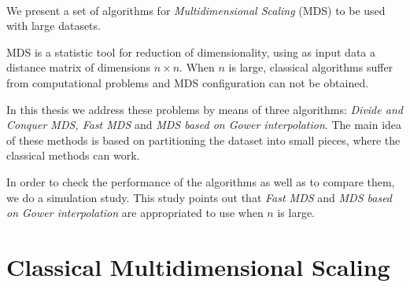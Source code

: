\documentclass[11pt]{report}
\begin{document}










\thispagestyle{empty}





\clearpage



 \\
\indent We present a set of algorithms for \textit{Multidimensional Scaling} (MDS) to 
be used with large datasets.

\indent MDS is a statistic tool for reduction of dimensionality, using as input
data a distance matrix of dimensions $n \times n$. When $n$ is large, classical
algorithms suffer from computational problems and MDS configuration can not be
obtained.

\indent In this thesis we address these problems by means of three algorithms:
\textit{Divide and Conquer MDS, Fast MDS} and 
\textit{MDS based on Gower interpolation}. The main idea of these methods is
based on partitioning the dataset into small pieces, where the classical 
methods can work.

\indent In order to check the performance of the algorithms as well as to 
compare them, we do a simulation study. This study
points out that \textit{Fast MDS} and \textit{MDS based on Gower interpolation} 
are appropriated to use when $n$ is large.

\tableofcontents
\thispagestyle{empty}

\chapter{Classical Multidimensional Scaling}
\end{document}
